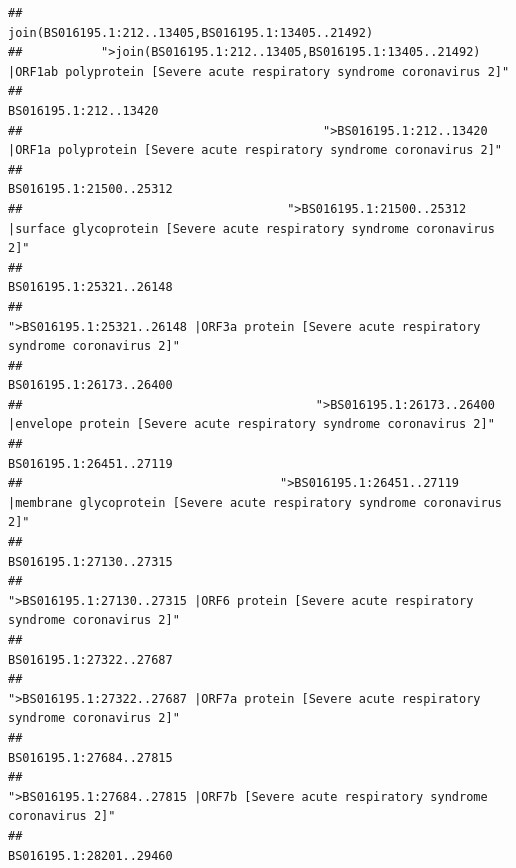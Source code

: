 \documentclass[
]{article}
\begin{document}
\begin{verbatim}
##                                                                                    join(BS016195.1:212..13405,BS016195.1:13405..21492) 
##           ">join(BS016195.1:212..13405,BS016195.1:13405..21492) |ORF1ab polyprotein [Severe acute respiratory syndrome coronavirus 2]" 
##                                                                                                                  BS016195.1:212..13420 
##                                          ">BS016195.1:212..13420 |ORF1a polyprotein [Severe acute respiratory syndrome coronavirus 2]" 
##                                                                                                                BS016195.1:21500..25312 
##                                     ">BS016195.1:21500..25312 |surface glycoprotein [Severe acute respiratory syndrome coronavirus 2]" 
##                                                                                                                BS016195.1:25321..26148 
##                                            ">BS016195.1:25321..26148 |ORF3a protein [Severe acute respiratory syndrome coronavirus 2]" 
##                                                                                                                BS016195.1:26173..26400 
##                                         ">BS016195.1:26173..26400 |envelope protein [Severe acute respiratory syndrome coronavirus 2]" 
##                                                                                                                BS016195.1:26451..27119 
##                                    ">BS016195.1:26451..27119 |membrane glycoprotein [Severe acute respiratory syndrome coronavirus 2]" 
##                                                                                                                BS016195.1:27130..27315 
##                                             ">BS016195.1:27130..27315 |ORF6 protein [Severe acute respiratory syndrome coronavirus 2]" 
##                                                                                                                BS016195.1:27322..27687 
##                                            ">BS016195.1:27322..27687 |ORF7a protein [Severe acute respiratory syndrome coronavirus 2]" 
##                                                                                                                BS016195.1:27684..27815 
##                                                    ">BS016195.1:27684..27815 |ORF7b [Severe acute respiratory syndrome coronavirus 2]" 
##                                                                                                                BS016195.1:28201..29460 

\end{verbatim}
\end{document}
